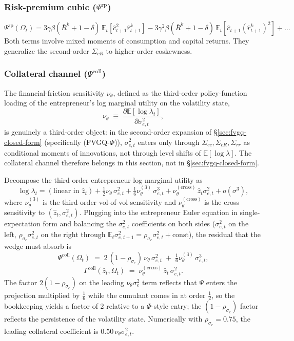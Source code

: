 \documentclass[11pt]{article}
\newcommand{\E}{\mathbb{E}}
\newcommand{\nuth}{\nu_\theta}
\newcommand{\nuthIII}{\nu_\theta^{(3)}}
\newcommand{\nuthx}{\nu_\theta^{(\mathrm{cross})}}
\theoremstyle{plain}
\theoremstyle{definition}
\begin{document}
\subsubsection*{Risk-premium cubic ($\Psi^{\mathrm{rp}}$)}

\begin{equation}
\Psi^{\mathrm{rp}}(\Omega_t)
=
3\gamma\beta(\bar R^k+1-\delta)\,\E_t[\hat c_{t+1}^2\hat r^k_{t+1}]
- 3\gamma^2\beta(\bar R^k+1-\delta)\,\E_t[\hat c_{t+1}(\hat r^k_{t+1})^2]
+ \dots
\tag{Psi-RP}
\end{equation}
Both terms involve mixed moments of consumption and capital returns. They
generalize the second-order $\Sigma_{cR}$ to higher-order coskewness.

\subsubsection*{Collateral channel ($\Psi^{\mathrm{coll}}$)}

The financial-friction sensitivity $\nuth$, defined as the
third-order policy-function loading of the entrepreneur's log marginal utility
on the volatility state,
\[
\nuth \;\equiv\; \frac{\partial \E[\log\lambda_t]}{\partial \sigma_{e,t}^2},
\]
is genuinely a third-order object: in the second-order expansion of
§\ref{sec:fvgq-closed-form} (specifically (FVGQ-$\Phi$)), $\sigma_{e,t}^2$
enters only through $\Sigma_{cc}, \Sigma_{cR}, \Sigma_{rr}$ as conditional
moments of innovations, not through level shifts of $\E[\log\lambda]$. The
collateral channel therefore belongs in this section, not in
§\ref{sec:fvgq-closed-form}.

Decompose the third-order entrepreneur log marginal utility as
\[
\log\lambda_t = (\text{linear in }\hat z_t)
+ \tfrac{1}{2}\nuth\,\sigma_{e,t}^2
+ \tfrac{1}{6}\nuthIII\,\sigma_{e,t}^3
+ \nuthx\,\hat z_t\sigma_{e,t}^2
+ o(\sigma^3),
\]
where $\nuthIII$ is the third-order vol-of-vol sensitivity and
$\nuthx$ is the cross sensitivity to $(\hat z_t,\sigma_{e,t}^2)$. Plugging
into the entrepreneur Euler equation in single-expectation form and
balancing the $\sigma_{e,t}^2$ coefficients on both sides
($\sigma_{e,t}^2$ on the left, $\rho_{\sigma_e}\sigma_{e,t}^2$ on the right
through $\E_t\sigma_{e,t+1}^2 = \rho_{\sigma_e}\sigma_{e,t}^2 +
\text{const}$), the residual that the wedge must absorb is
\begin{equation}
\Psi^{\mathrm{coll}}(\Omega_t)
\;=\;
2\,(1-\rho_{\sigma_e})\,\nuth\,\sigma_{e,t}^2
\;+\;
\tfrac{1}{6}\nuthIII\,\sigma_{e,t}^3,
\tag{Psi-Coll}
\end{equation}
\begin{equation}
\Gamma^{\mathrm{coll}}(\hat z_t,\Omega_t)
\;=\;
\nuthx\,\hat z_t\,\sigma_{e,t}^2.
\tag{Gam-Coll}
\end{equation}
The factor $2(1-\rho_{\sigma_e})$ on the leading $\nuth\sigma_e^2$ term
reflects that $\Psi$ enters the projection multiplied by $\tfrac{1}{6}$ while
the cumulant comes in at order $\tfrac{1}{2}$, so the bookkeeping yields a
factor of $2$ relative to a $\Phi$-style entry; the $(1-\rho_{\sigma_e})$
factor reflects the persistence of the volatility state. Numerically with
$\rho_{\sigma_e}=0.75$, the leading collateral coefficient is
$0.50\,\nuth\sigma_{e,t}^2$.
\end{document}
